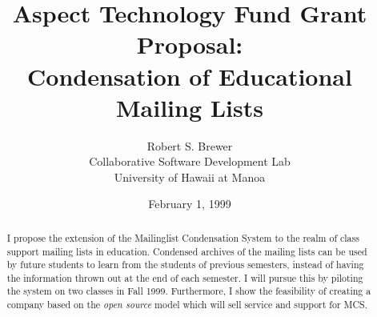 \documentclass [11pt, titlepage] {article}
\title{Aspect Technology Fund Grant Proposal:\\Condensation of Educational
Mailing Lists}
\author{Robert S. Brewer\\Collaborative Software Development Lab\\University of 
Hawaii at Manoa}
\date{February 1, 1999}
\begin{document}
\maketitle

\begin{abstract}
  I propose the extension of the Mailinglist Condensation System to the realm
  of class support mailing lists in education. Condensed archives of the
  mailing lists can be used by future students to learn from the students of
  previous semesters, instead of having the information thrown out at the end
  of each semester. I will pursue this by piloting the system on two classes in
  Fall 1999. Furthermore, I show the feasibility of creating a company based on
  the {\em open source} model which will sell service and support for MCS.
\end{abstract}






\end{document}
